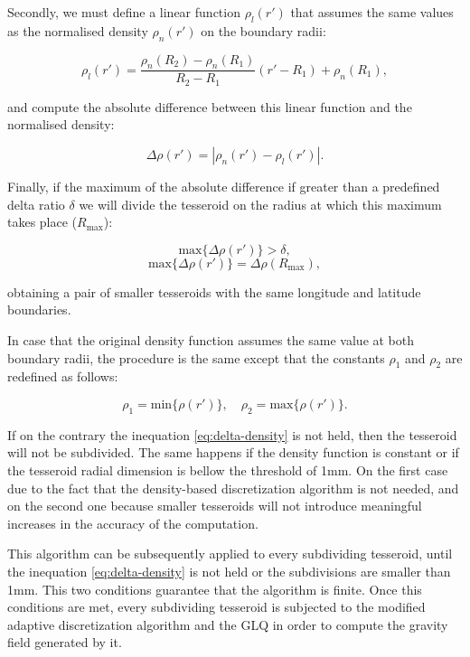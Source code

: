 \documentclass[extra]{gji}
\begin{document}
Secondly, we must define a linear function $\rho_l(r')$ that assumes the same values as the normalised density $\rho_n(r')$ on the boundary radii:

\begin{equation}
    \rho_l(r') =
    \frac{ \rho_n(R_2) - \rho_n(R_1) }{ R_2 - R_1 } (r' - R_1) + \rho_n(R_1),
\end{equation}

\noindent and compute the absolute difference between this linear function and the normalised density:

\begin{equation}
    \Delta \rho (r') = | \rho_n(r') - \rho_l(r') |.
\end{equation}

Finally, if the maximum of the absolute difference if greater than a predefined delta ratio $\delta$ we will divide the tesseroid on the radius at which this maximum takes place ($R_\text{max}$):

\begin{equation}
    \text{max}\{ \Delta \rho(r') \} > \delta,
    \label{eq:delta-density}
\end{equation}
\begin{equation}
    \text{max}\{ \Delta \rho(r') \} = \Delta \rho(R_\text{max}),
\end{equation}

\noindent obtaining a pair of smaller tesseroids with the same longitude and latitude boundaries.

In case that the original density function assumes the same value at both boundary radii, the procedure is the same except that the constants $\rho_1$ and $\rho_2$ are redefined as follows:

\begin{equation}
    \rho_1 = \text{min}\{ \rho(r') \}, \quad
    \rho_2 = \text{max}\{ \rho(r') \}.
\end{equation}

If on the contrary the inequation \ref{eq:delta-density} is not held, then the tesseroid will not be subdivided.
The same happens if the density function is constant or if the tesseroid radial dimension is bellow the threshold of 1mm.
On the first case due to the fact that the density-based discretization algorithm is not needed, and on the second one because smaller tesseroids will not introduce meaningful increases in the accuracy of the computation.

This algorithm can be subsequently applied to every subdividing tesseroid, until the inequation \ref{eq:delta-density} is not held or the subdivisions are smaller than 1mm.
This two conditions guarantee that the algorithm is finite.
Once this conditions are met, every subdividing tesseroid is subjected to the modified adaptive discretization algorithm and the GLQ in order to compute the gravity field generated by it.
\end{document}

